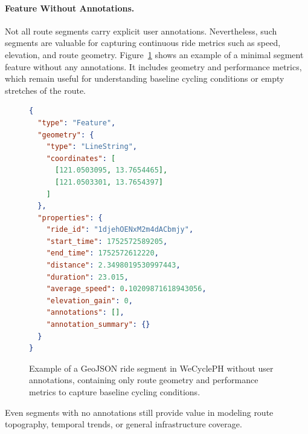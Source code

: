\paragraph{Feature Without Annotations.} Not all route segments carry explicit user annotations. Nevertheless, such segments are valuable for capturing continuous ride metrics such as speed, elevation, and route geometry. Figure~\ref{fig:SampleFeature_NoAnnotation} shows an example of a minimal segment feature without any annotations. It includes geometry and performance metrics, which remain useful for understanding baseline cycling conditions or empty stretches of the route.
\begin{figure}[H]
\centering
\begin{lstlisting}[language=json, label={lst:feature_none}]
{
  "type": "Feature",
  "geometry": {
    "type": "LineString",
    "coordinates": [
      [121.0503095, 13.7654465],
      [121.0503301, 13.7654397]
    ]
  },
  "properties": {
    "ride_id": "1djehOENxM2m4dACbmjy",
    "start_time": 1752572589205,
    "end_time": 1752572612220,
    "distance": 2.3498019530997443,
    "duration": 23.015,
    "average_speed": 0.10209871618943056,
    "elevation_gain": 0,
    "annotations": [],
    "annotation_summary": {}
  }
}
\end{lstlisting}
\caption{Example of a GeoJSON ride segment in WeCyclePH without user annotations, containing only route geometry and performance metrics to capture baseline cycling conditions.}
\label{fig:SampleFeature_NoAnnotation}
\end{figure}
Even segments with no annotations still provide value in modeling route topography, temporal trends, or general infrastructure coverage.

